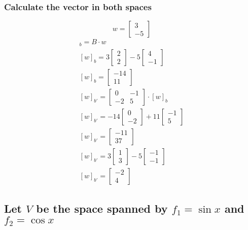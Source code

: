 \documentclass[12pt, a4paper]{article}
\begin{document}
			\subsubsection{Calculate the vector in both spaces}
				$$w=\begin{bmatrix}3\\-5\end{bmatrix}$$
				\begin{align*}
					[w]_b=B\cdot w\\
					[w]_b=3\begin{bmatrix}2 \\2 \end{bmatrix}-5\begin{bmatrix}4 \\-1 \end{bmatrix}\\
					[w]_b=\begin{bmatrix}-14\\11\end{bmatrix}\\
					[w]_{b'}= \begin{bmatrix} 0 & -1 \\ -2 & 5 \end{bmatrix}\cdot [w]_b\\
					[w]_{b'}=-14\begin{bmatrix} 0 \\ -2  \end{bmatrix}+11\begin{bmatrix} -1 \\  5 \end{bmatrix}\\
					[w]_{b'}=\begin{bmatrix} -11\\ 37 \end{bmatrix}\\
					[w]_{b'}=3\begin{bmatrix} 1 \\ 3  \end{bmatrix}-5\begin{bmatrix} -1 \\-1 \end{bmatrix}\\
					[w]_{b'}=\begin{bmatrix} -2\\ 4\end{bmatrix}
				\end{align*}
		\subsection{Let $V$ be the space spanned by $f_1=\sin x$ and $f_2=\cos x$}
\end{document}
